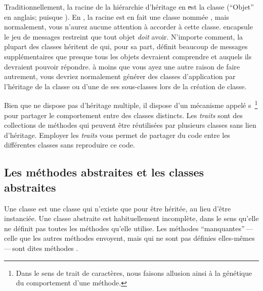 \documentclass[a4paper,10pt,twoside]{book}
\begin{document}
Traditionnellement, la racine de la hiérarchie d'héritage en \st est la classe  (``Objet'' en anglais; puisque \mantra).
En \pharo, la racine est en fait une classe nommée , mais
normalement, vous n'aurez aucune attention à accorder à cette classe.
 encapsule le jeu de messages restreint que tout objet \emph{doit} avoir.  
N'importe comment, la plupart des classes héritent de  qui, pour
sa part, définit beaucoup de messages supplémentaires que presque tous les
objets devraient comprendre et auquels ils devraient pouvoir répondre.
à moins que vous ayez une autre raison de faire autrement, vous devriez
normalement générer des classes d'application par l'héritage
de la classe  ou d'une de ses sous-classes lors de la création de classe.



Bien que \pharo ne dispose pas d'héritage multiple, il dispose d'un mécanisme appelé %
s~\footnote{Dans le sens de trait de caractères, nous faisons allusion ainsi à la génétique du comportement d'une méthode.} 
pour partager le comportement entre des classes distincts.
Les \emph{traits} sont des collections de méthodes qui peuvent être réutilisées par plusieurs classes sans lien d'héritage. Employer les \emph{traits} vous permet de partager du code entre les différentes classes sans reproduire ce code.

\subsection{Les méthodes abstraites et les classes abstraites}

Une classe  est une classe qui n'existe que pour être héritée, au lieu d'être instanciée.
Une classe abstraite est habituellement incomplète, dans le sens qu'elle ne définit pas toutes les méthodes qu'elle utilise.
Les méthodes ``manquantes''\,---\,celle que les autres méthodes envoyent, mais qui ne sont pas définies elles-mêmes\,---\,sont dites mé\-tho\-des .
\end{document}
